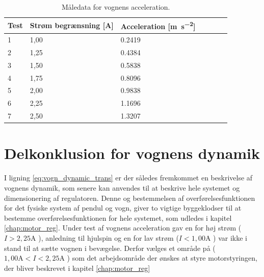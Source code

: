 \begin{table}[h!]
	\small
	\centering
	\caption{Måledata for vognens acceleration.}
	\label{tab:maaldata_vogn}
	\begin{threeparttable}
		\begin{tabular}{ l l l l l l l }
			\toprule
			\multicolumn{1}{l}{\textbf{Test}}       &
			\multicolumn{1}{l}{\textbf{Strøm begrænsning [\si{\ampere}]}}       &
			\multicolumn{1}{l}{\textbf{Acceleration [\si{\meter\per\second\squared}]}}   \\ 
			\hline
			1 &  1,00  &  \num{0.2419}  \\
			2 &  1,25  &  \num{0.4384}  \\
			3 &  1,50  &  \num{0.5838}  \\
			4 &  1,75  &  \num{0.8096}  \\
			5 &  2,00  &  \num{0.9838}  \\
			6 &  2,25  &  \num{1.1696}  \\
			7 &  2,50  &  \num{1.3207}  \\
			\hline
			\bottomrule
		\end{tabular}
	\end{threeparttable}
\end{table} 

\section{Delkonklusion for vognens dynamik}

I ligning \ref{eq:vogn_dynamic_trans} er der således fremkommet en beskrivelse af vognens dynamik, som senere kan anvendes til at beskrive hele systemet og dimensionering af regulatoren.
Denne og bestemmelsen af overførelsesfunktionen for det fysiske system af pendul og vogn, giver to vigtige byggeklodser til at bestemme overførelsesfunktionen for hele systemet, som udledes i kapitel \ref{chap:motor_reg}.
Under test af vognens acceleration gav en for høj strøm ($I > 2,25 \si{\ampere} $ ), anledning til hjulspin og en for lav strøm ($I < 1,00 \si{\ampere} $ ) var ikke i stand til at sætte vognen i bevægelse.
Derfor vælges et område på ($ 1,00 \si{\ampere} <  I < 2,25 \si{\ampere} $ ) som det arbejdsområde der ønskes at styre motorstyringen, der bliver beskrevet i kapitel \ref{chap:motor_reg}



 